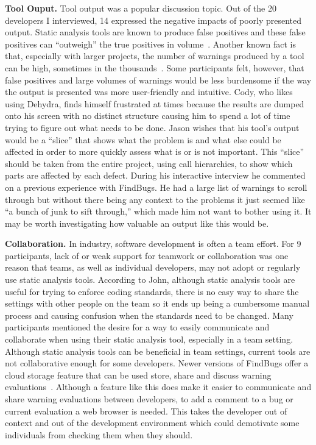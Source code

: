 \textbf{Tool Ouput.} 
Tool output was a popular discussion topic. Out of the 20 developers I
interviewed, 14 expressed the negative impacts of poorly presented
output. Static analysis tools are known to produce false positives and these
false positives can ``outweigh'' the true positives in
volume~\cite{Shen:2011:EFindBugs}. Another known fact is that, especially with
larger projects, the number of warnings produced by a tool can be high,
sometimes in the thousands~\cite{Ayewah:2010:GFF}. Some participants
felt, however, that false positives and large volumes of warnings would be less
burdensome if the way the output is presented was more user-friendly and
intuitive. Cody, who likes using Dehydra, finds himself frustrated at times
because the results are dumped onto his screen with no distinct structure
causing him to spend a lot of time trying to figure out what needs to be done.
Jason wishes that his tool's output would be a ``slice'' that shows what the
problem is and what else could be affected in order to more quickly assess what
is or is not important. This ``slice'' should be taken from the entire project,
using call hierarchies, to show which parts are affected by each defect. During
his interactive interview he commented on a previous experience with FindBugs.
He had a large list of warnings to scroll through but without there being any
context to the problems it just seemed like ``a bunch of junk to sift through,''
which made him not want to bother using it. It may be worth investigating
how valuable an output like this would be.

\textbf{Collaboration.}
In industry, software development is often a team effort. For 9 participants, lack of or weak support for teamwork or collaboration was one
reason that teams, as well as individual developers, may not adopt or regularly
use static analysis tools.
According to John, although static analysis tools are useful for trying to
enforce coding standards, there is no easy way to share the settings with other
people on the team so it ends up being a cumbersome manual process and causing
confusion when the standards need to be changed. Many participants
mentioned the desire for a way to easily communicate and collaborate when using
their static analysis tool, especially in a team setting.
Although static analysis tools can be beneficial in team settings, current tools
are not collaborative enough for some developers. Newer versions of FindBugs
offer a cloud storage feature that can be used store, share and discuss warning
evaluations~\cite{FindBugsCloud}. Although a feature like this does make it
easier to communicate and share warning evaluations between developers, to add a
comment to a bug or current evaluation a web browser is needed. This takes the developer
out of context and out of the development environment which could demotivate
some individuals from checking them when they should.

